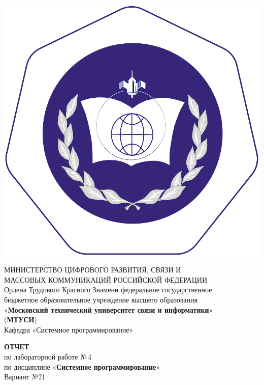 \documentclass[14pt]{extarticle}
\begin{document}
{\par\centering %

\includegraphics[width=0.12\linewidth]{logo.pdf} %

МИНИСТЕРСТВО ЦИФРОВОГО РАЗВИТИЯ, СВЯЗИ И\\МАССОВЫХ КОММУНИКАЦИЙ РОССИЙСКОЙ ФЕДЕРАЦИИ\\[5mm] %

Ордена Трудового Красного Знамени федеральное государственное\\ бюджетное образовательное учреждение высшего образования\\ «\textbf{Московский технический университет связи и информатики}»\\(\textbf{МТУСИ})\\[5mm] 
	
Кафедра «Системное программирование»
\par}


\vfill\vfill %

{\par\centering
\textbf{ОТЧЕТ}\\ по лабораторной работе №\,4\\[5mm]

по дисциплине «\textbf{Системное программирование}»\\[5mm]

Вариант №21
\par}
\end{document}
